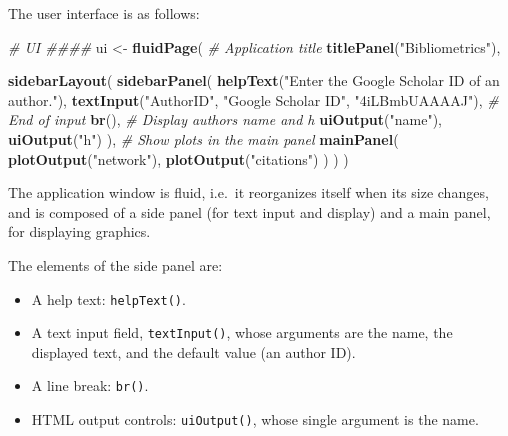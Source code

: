 \documentclass[
  12pt,
  american,
  a4paper,
  extrafontsizes,onecolumn,openright
  ]{memoir}
\newenvironment{Shaded}{\begin{snugshade}}{\end{snugshade}}
\newcommand{\CommentTok}[1]{\textcolor[rgb]{0.56,0.35,0.01}{\textit{#1}}}
\newcommand{\FunctionTok}[1]{\textcolor[rgb]{0.13,0.29,0.53}{\textbf{#1}}}
\newcommand{\NormalTok}[1]{#1}
\newcommand{\OtherTok}[1]{\textcolor[rgb]{0.56,0.35,0.01}{#1}}
\newcommand{\StringTok}[1]{\textcolor[rgb]{0.31,0.60,0.02}{#1}}
\providecommand{\tightlist}{%
  \setlength{\itemsep}{0pt}\setlength{\parskip}{0pt}}
\newlength{\rf}
\begin{document}
The user interface is as follows:

\scriptsize

\begin{Shaded}
\begin{Highlighting}[]
\CommentTok{\# UI \#\#\#\#}
\NormalTok{ui }\OtherTok{\textless{}{-}} \FunctionTok{fluidPage}\NormalTok{(}
  \CommentTok{\# Application title}
  \FunctionTok{titlePanel}\NormalTok{(}\StringTok{"Bibliometrics"}\NormalTok{),}
  
  \FunctionTok{sidebarLayout}\NormalTok{(}
    \FunctionTok{sidebarPanel}\NormalTok{(}
      \FunctionTok{helpText}\NormalTok{(}\StringTok{"Enter the Google Scholar ID of an author."}\NormalTok{),}
      \FunctionTok{textInput}\NormalTok{(}\StringTok{"AuthorID"}\NormalTok{, }\StringTok{"Google Scholar ID"}\NormalTok{, }\StringTok{"4iLBmbUAAAAJ"}\NormalTok{),}
      \CommentTok{\# End of input}
      \FunctionTok{br}\NormalTok{(),}
      \CommentTok{\# Display author\textquotesingle{}s name and h}
      \FunctionTok{uiOutput}\NormalTok{(}\StringTok{"name"}\NormalTok{),}
      \FunctionTok{uiOutput}\NormalTok{(}\StringTok{"h"}\NormalTok{)}
\NormalTok{    ),}
    \CommentTok{\# Show plots in the main panel}
    \FunctionTok{mainPanel}\NormalTok{(}
      \FunctionTok{plotOutput}\NormalTok{(}\StringTok{"network"}\NormalTok{),}
      \FunctionTok{plotOutput}\NormalTok{(}\StringTok{"citations"}\NormalTok{)}
\NormalTok{    )}
\NormalTok{  )}
\NormalTok{)}
\end{Highlighting}
\end{Shaded}

\normalsize

The application window is fluid, i.e.~it reorganizes itself when its size changes, and is composed of a side panel (for text input and display) and a main panel, for displaying graphics.

The elements of the side panel are:

\begin{itemize}
\tightlist
\item
  A help text: \texttt{helpText()}.
\item
  A text input field, \texttt{textInput()}, whose arguments are the name, the displayed text, and the default value (an author ID).
\item
  A line break: \texttt{br()}.
\item
  HTML output controls: \texttt{uiOutput()}, whose single argument is the name.
\end{itemize}
\end{document}
